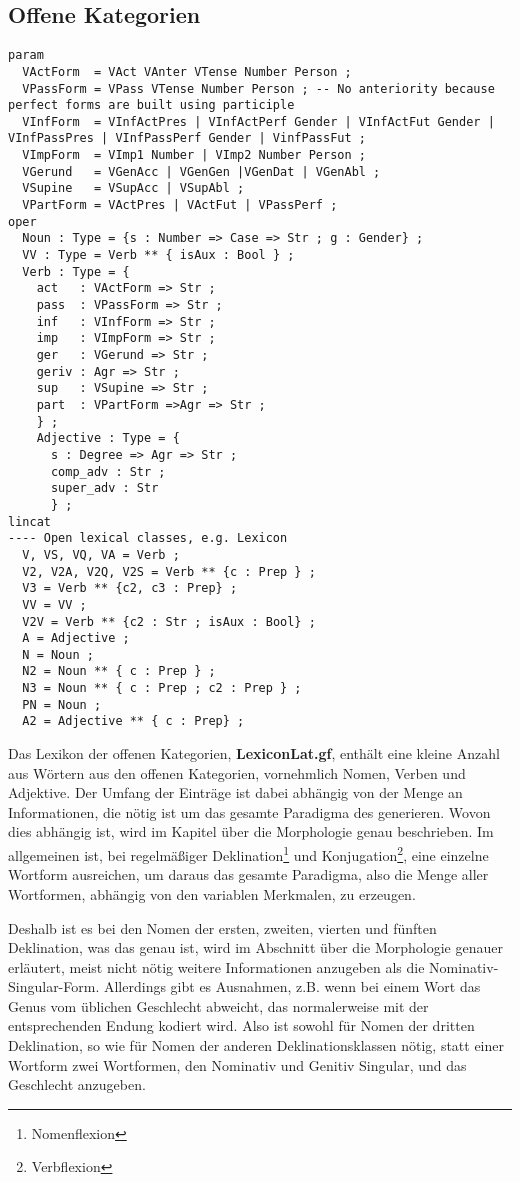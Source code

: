 \subsection{Offene Kategorien}
\label{subsec:offene}
\begin{lstlisting}[float=h!,caption={Für \textbf{LexiconLat.gf} nötige \texttt{lincat}-Definitionen für offene Kategorien},label={GF-Lexicon-Lincat},basicstyle=\small]
param 
  VActForm  = VAct VAnter VTense Number Person ;
  VPassForm = VPass VTense Number Person ; -- No anteriority because perfect forms are built using participle
  VInfForm  = VInfActPres | VInfActPerf Gender | VInfActFut Gender | VInfPassPres | VInfPassPerf Gender | VinfPassFut ;
  VImpForm  = VImp1 Number | VImp2 Number Person ;
  VGerund   = VGenAcc | VGenGen |VGenDat | VGenAbl ;
  VSupine   = VSupAcc | VSupAbl ;
  VPartForm = VActPres | VActFut | VPassPerf ;
oper
  Noun : Type = {s : Number => Case => Str ; g : Gender} ;
  VV : Type = Verb ** { isAux : Bool } ;
  Verb : Type = {
    act   : VActForm => Str ;
    pass  : VPassForm => Str ;
    inf   : VInfForm => Str ;
    imp   : VImpForm => Str ;
    ger   : VGerund => Str ;
    geriv : Agr => Str ; 
    sup   : VSupine => Str ;
    part  : VPartForm =>Agr => Str ;
    } ;
    Adjective : Type = {
      s : Degree => Agr => Str ;
      comp_adv : Str ; 
      super_adv : Str 
      } ;
lincat
---- Open lexical classes, e.g. Lexicon
  V, VS, VQ, VA = Verb ; 
  V2, V2A, V2Q, V2S = Verb ** {c : Prep } ;
  V3 = Verb ** {c2, c3 : Prep} ;
  VV = VV ;
  V2V = Verb ** {c2 : Str ; isAux : Bool} ;
  A = Adjective ;
  N = Noun ;
  N2 = Noun ** { c : Prep } ;
  N3 = Noun ** { c : Prep ; c2 : Prep } ;
  PN = Noun ;
  A2 = Adjective ** { c : Prep} ;
\end{lstlisting}
Das Lexikon der offenen Kategorien, \textbf{LexiconLat.gf}, enthält eine kleine Anzahl aus Wörtern aus den offenen Kategorien, vornehmlich Nomen, Verben und Adjektive. Der Umfang der Einträge ist dabei abhängig von der Menge an Informationen, die nötig ist um das gesamte Paradigma des generieren. Wovon dies abhängig ist, wird im Kapitel über die Morphologie genau beschrieben. Im allgemeinen ist, bei regelmäßiger Deklination\footnote{Nomenflexion} und Konjugation\footnote{Verbflexion}, eine einzelne Wortform ausreichen, um daraus das gesamte Paradigma, also die Menge aller Wortformen, abhängig von den variablen Merkmalen, zu erzeugen. \par
Deshalb ist es bei den Nomen der ersten, zweiten, vierten und fünften Deklination, was das genau ist, wird im Abschnitt über die Morphologie genauer erläutert, meist nicht nötig weitere Informationen anzugeben als die Nominativ-Singular-Form. Allerdings gibt es Ausnahmen, z.B. wenn bei einem Wort das Genus vom üblichen Geschlecht abweicht, das normalerweise mit der entsprechenden Endung kodiert wird. Also ist sowohl für Nomen der dritten Deklination, so wie für Nomen der anderen Deklinationsklassen nötig, statt einer Wortform zwei Wortformen, den Nominativ und Genitiv Singular, und das Geschlecht anzugeben. \par
